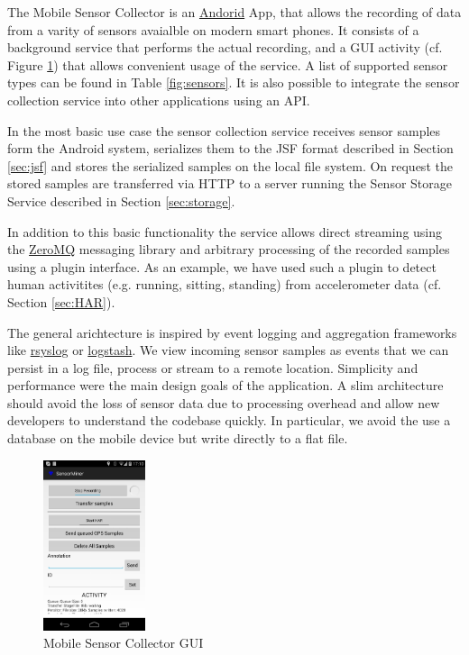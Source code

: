 \documentclass[times, 10pt,twocolumn]{article}
\begin{document}

The Mobile Sensor Collector is an \href{http://www.androdi.com}{Andorid} App, that allows the recording of data from a varity of sensors avaialble on modern smart phones.
It consists of a background service that performs the actual recording, and a GUI activity (cf. Figure \ref{fig:gui}) that allows convenient usage of the service.
A list of supported sensor types can be found in Table \ref{fig:sensors}.
It is also possible to integrate the sensor collection service into other applications using an API.

In the most basic use case the sensor collection service receives sensor samples form the Android system, serializes them to the JSF format described in Section \ref{sec:jsf} and stores the serialized samples on the local file system.
On request the stored samples are transferred via HTTP to a server running the Sensor Storage Service described in Section \ref{sec:storage}.

In addition to this basic functionality the service allows direct streaming using the \href{http://zeromq.org/}{ZeroMQ} messaging library and arbitrary processing of the recorded samples using a plugin interface.
As an example, we have used such a plugin to detect human activitites (e.g. running, sitting, standing) from accelerometer data (cf. Section \ref{sec:HAR}).

The general arichtecture is inspired by event logging and aggregation frameworks like \href{http://www.rsyslog.com/}{rsyslog} or \href{http://logstash.net/}{logstash}.
We view incoming sensor samples as events that we can persist in a log file, process or stream to a remote location.
Simplicity and performance were the main design goals of the application.
A slim architecture should avoid the loss of sensor data due to processing overhead and
allow new developers to understand the codebase quickly.
In particular, we avoid the use a database on the mobile device but write directly to a flat file.

\begin{figure}[t]
\begin{center}
\includegraphics[width=3cm]{img/sc_gui.png}
\end{center}
\caption{Mobile Sensor Collector GUI}
\label{fig:gui}
\end{figure}
\end{document}
